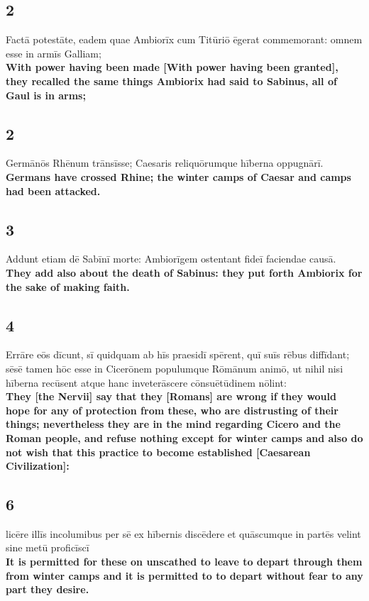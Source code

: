 \documentclass{article}
\begin{document}
\subsection*{2}
Factā potestāte, eadem quae Ambiorīx cum Titūriō ēgerat commemorant: omnem esse in armīs Galliam;\\
\textbf{With power having been made [With power having been granted], they recalled the same things Ambiorix had said to Sabinus, all of Gaul is in arms; }

\subsection*{2}
Germānōs Rhēnum trānsīsse; Caesaris reliquōrumque hīberna oppugnārī.\\
\textbf{Germans have crossed Rhine; the winter camps of Caesar and camps had been attacked.}

\subsection*{3}
Addunt etiam dē Sabīnī morte: Ambiorīgem ostentant fideī faciendae causā.\\
\textbf{They add also about the death of Sabinus: they put forth Ambiorix for the sake of making faith.}

\subsection*{4}
Errāre eōs dīcunt, sī quidquam ab hīs praesidī spērent, quī suīs rēbus diffīdant; sēsē tamen hōc esse in Cicerōnem populumque Rōmānum animō, ut nihil nisi hīberna recūsent atque hanc inveterāscere cōnsuētūdinem nōlint:\\
\textbf{They [the Nervii] say that they [Romans] are wrong if they would hope for any of protection from these, who are distrusting of their things; nevertheless they are in the mind regarding Cicero and the Roman people, and refuse nothing except for winter camps and also do not wish that this practice to become established [Caesarean Civilization]:}

\subsection*{6}
licēre illīs incolumibus per sē ex hībernis discēdere et quāscumque in partēs velint sine metū proficīscī\\
\textbf{It is permitted for these on unscathed to leave to depart through them from winter camps and it is permitted to to depart without fear to any part they desire.}
\end{document}
